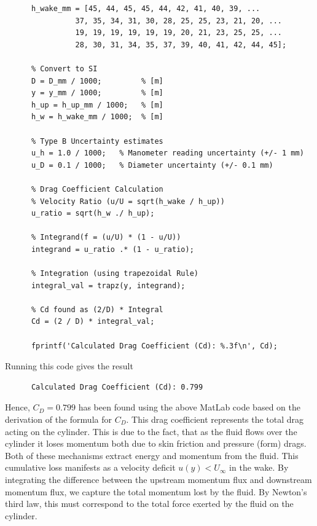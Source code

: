 \begin{derivation}
\begin{verbatim}
      h_wake_mm = [45, 44, 45, 45, 44, 42, 41, 40, 39, ...
                37, 35, 34, 31, 30, 28, 25, 25, 23, 21, 20, ...
                19, 19, 19, 19, 19, 19, 20, 21, 23, 25, 25, ...
                28, 30, 31, 34, 35, 37, 39, 40, 41, 42, 44, 45];

      % Convert to SI
      D = D_mm / 1000;         % [m]
      y = y_mm / 1000;         % [m]
      h_up = h_up_mm / 1000;   % [m]
      h_w = h_wake_mm / 1000;  % [m]

      % Type B Uncertainty estimates
      u_h = 1.0 / 1000;   % Manometer reading uncertainty (+/- 1 mm)
      u_D = 0.1 / 1000;   % Diameter uncertainty (+/- 0.1 mm)

      % Drag Coefficient Calculation
      % Velocity Ratio (u/U = sqrt(h_wake / h_up))
      u_ratio = sqrt(h_w ./ h_up);

      % Integrand(f = (u/U) * (1 - u/U))
      integrand = u_ratio .* (1 - u_ratio);

      % Integration (using trapezoidal Rule)
      integral_val = trapz(y, integrand);

      % Cd found as (2/D) * Integral
      Cd = (2 / D) * integral_val;

      fprintf('Calculated Drag Coefficient (Cd): %.3f\n', Cd);
    \end{verbatim}
    Running this code gives the result
    \begin{verbatim}
      Calculated Drag Coefficient (Cd): 0.799
    \end{verbatim}
    Hence, $C_D = \num{0,799}$ has been found using the above MatLab code based on the derivation of the formula for $C_D$. This drag coefficient represents the total drag acting on the cylinder. This is due to the fact, that as the fluid flows over the cylinder it loses momentum both due to skin friction and pressure (form) drags. Both of these mechanisms extract energy and momentum from the fluid.
    This cumulative loss manifests as a velocity deficit $u(y) < U_{\infty}$ in the wake. 
    By integrating the difference between the upstream momentum flux and downstream momentum flux, we capture the total momentum lost by the fluid.
    By Newton's third law, this must correspond to the total force exerted by the fluid on the cylinder.


\end{derivation}

